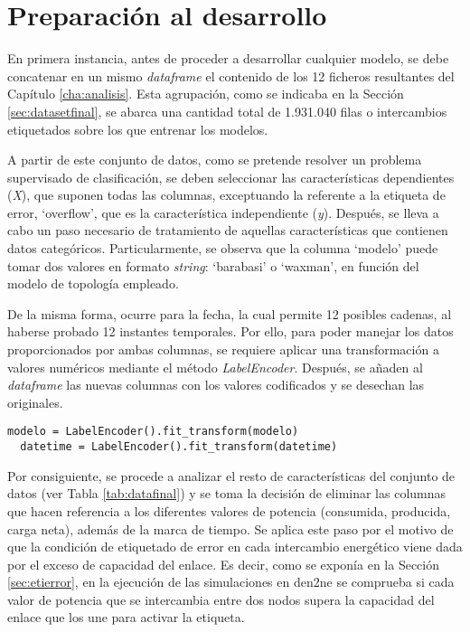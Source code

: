 \section{Preparación al desarrollo}
\label{sec:adicional}

En primera instancia, antes de proceder a desarrollar cualquier modelo, se debe concatenar en un mismo \textit{dataframe} el contenido de los 12 ficheros resultantes del Capítulo \ref{cha:analisis}. Esta agrupación, como se indicaba en la Sección \ref{sec:datasetfinal}, se abarca una cantidad total de 1.931.040 filas o intercambios etiquetados sobre los que entrenar los modelos. 

\vspace{3mm}

A partir de este conjunto de datos, como se pretende resolver un problema supervisado de clasificación, se deben seleccionar las características dependientes (\textit{X}), que suponen todas las columnas, exceptuando la referente a la etiqueta de error, `overflow', que es la característica independiente (\textit{y}). Después, se lleva a cabo un paso necesario de tratamiento de aquellas características que contienen datos categóricos. Particularmente, se observa que la columna `modelo' puede tomar dos valores en formato \textit{string}: `barabasi' o `waxman', en función del modelo de topología empleado. 

\vspace{3mm}

De la misma forma, ocurre para la fecha, la cual permite 12 posibles cadenas, al haberse probado 12 instantes temporales. Por ello, para poder manejar los datos proporcionados por ambas columnas, se requiere aplicar una transformación a valores numéricos mediante el método \textit{LabelEncoder}. Después, se añaden al \textit{dataframe} las nuevas columnas con los valores codificados y se desechan las originales.

\vspace{3mm}

\begin{lstlisting}[style=Python, caption={Codificación de los datos categóricos}]
  modelo = LabelEncoder().fit_transform(modelo) 
  datetime = LabelEncoder().fit_transform(datetime) 
\end{lstlisting}

\vspace{3mm}

Por consiguiente, se procede a analizar el resto de características del conjunto de datos (ver Tabla \ref{tab:datafinal}) y se toma la decisión de eliminar las columnas que hacen referencia a los diferentes valores de potencia (consumida, producida, carga neta), además de la marca de tiempo. Se aplica este paso por el motivo de que la condición de etiquetado de error en cada intercambio energético viene dada por el exceso de capacidad del enlace. Es decir, como se exponía en la Sección \ref{sec:etierror}, en la ejecución de las simulaciones en \gls{den2ne} se comprueba si cada valor de potencia que se intercambia entre dos nodos supera la capacidad del enlace que los une para activar la etiqueta. 

